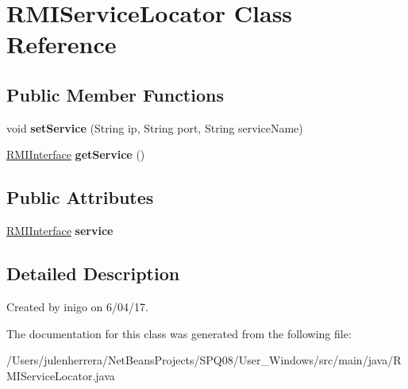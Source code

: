 \hypertarget{class_r_m_i_service_locator}{}\section{R\+M\+I\+Service\+Locator Class Reference}
\label{class_r_m_i_service_locator}
\subsection*{Public Member Functions}
\begin{DoxyCompactItemize}
\item 
\mbox{\label{class_r_m_i_service_locator_ae27c78932b4a52fe41ea496a9344082f}} 
void {\bfseries set\+Service} (String ip, String port, String service\+Name)
\item 
\mbox{\label{class_r_m_i_service_locator_a18767a38d540266010b13d039125d130}} 
\hyperlink{interface_r_m_i_interface}{R\+M\+I\+Interface} {\bfseries get\+Service} ()
\end{DoxyCompactItemize}
\subsection*{Public Attributes}
\begin{DoxyCompactItemize}
\item 
\mbox{\label{class_r_m_i_service_locator_a2735529accb233da0278e01f14c0b1c8}} 
\hyperlink{interface_r_m_i_interface}{R\+M\+I\+Interface} {\bfseries service}
\end{DoxyCompactItemize}


\subsection{Detailed Description}
Created by inigo on 6/04/17. 

The documentation for this class was generated from the following file\+:\begin{DoxyCompactItemize}
\item 
/\+Users/julenherrera/\+Net\+Beans\+Projects/\+S\+P\+Q08/\+User\+\_\+\+Windows/src/main/java/R\+M\+I\+Service\+Locator.\+java\end{DoxyCompactItemize}
